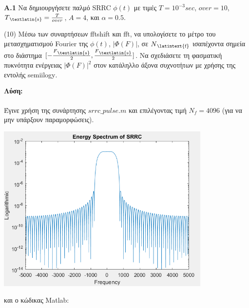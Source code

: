 \newpage


\begin{justify}
    {\bf  Α.1} Να δημιουργήσετε παλμό \textlatin{SRRC} $\phi(t)$
    με τιμές  $T = 10^{-3} sec$, $over=10$, 
    $T\textsubscript{\textlatin{s}}=\frac{T}{over}$, $A=4$, και 
    $\alpha = 0.5$.
\end{justify}

\begin{justify}
    (10) Μέσω των συναρτήσεων \textlatin{fftshift} και
    \textlatin{fft}, να υπολογίσετε το μέτρο του μετασχηματισμού
    \textlatin{Fourier} της $\phi(t)$, $|\Phi(F)|$, 
    σε $N\textsubscript{\latintext{f}}$ ισαπέχοντα σημεία στο διάστημα
    $[-\frac{F\textsubscript{\textlatin{s}}}{2},\frac{F\textsubscript{\textlatin{s}}}{2}]$.
    Να σχεδιάσετε τη φασματική πυκνότητα ενέργειας $|\Phi(F)|^{2}$
    στον κατάληλλο άξονα συχνοτήτων με χρήσης της εντολής \textlatin{semiilogy}.
\end{justify}

\begin{justify}
    {\bf Λύση:}\\\\
    Έγινε χρήση της συνάρτησης $srrc\_pulse.m$ και
    επιλέγοντας τιμή $N_f=4096$ (για να μην υπάρξουν
    παραμορφώσεις).
\end{justify}

\begin{center}
    \centering
    \includegraphics[width=0.8\textwidth]{ALPHA/images/a1.png} %
\end{center}


\begin{justify}
    και ο κώδικας \textlatin{Matlab}:
\end{justify}

